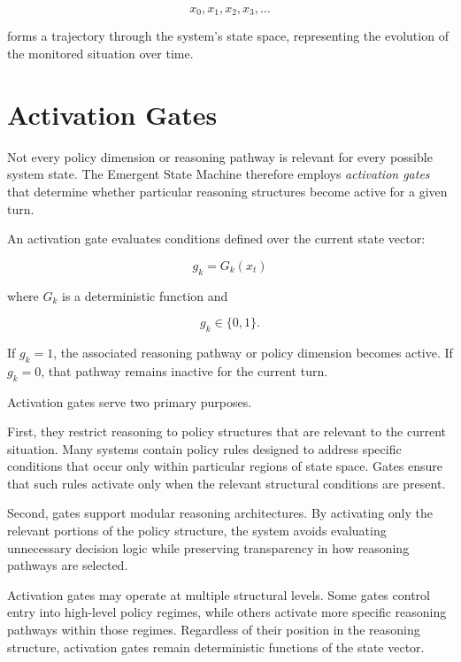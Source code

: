 \documentclass[11pt]{article}
\begin{document}
\begin{equation}
x_0, x_1, x_2, x_3, \dots
\end{equation}

forms a trajectory through the system's state space, representing the evolution of the monitored situation over time.




\section{Activation Gates}

Not every policy dimension or reasoning pathway is relevant for every possible system state. The Emergent State Machine therefore employs \emph{activation gates} that determine whether particular reasoning structures become active for a given turn.

An activation gate evaluates conditions defined over the current state vector:

\begin{equation}
g_k = G_k(x_t)
\end{equation}

where $G_k$ is a deterministic function and

\begin{equation}
g_k \in \{0,1\}.
\end{equation}

If $g_k = 1$, the associated reasoning pathway or policy dimension becomes active. If $g_k = 0$, that pathway remains inactive for the current turn.

Activation gates serve two primary purposes.

First, they restrict reasoning to policy structures that are relevant to the current situation. Many systems contain policy rules designed to address specific conditions that occur only within particular regions of state space. Gates ensure that such rules activate only when the relevant structural conditions are present.

Second, gates support modular reasoning architectures. By activating only the relevant portions of the policy structure, the system avoids evaluating unnecessary decision logic while preserving transparency in how reasoning pathways are selected.

Activation gates may operate at multiple structural levels. Some gates control entry into high-level policy regimes, while others activate more specific reasoning pathways within those regimes. Regardless of their position in the reasoning structure, activation gates remain deterministic functions of the state vector.
\end{document}
